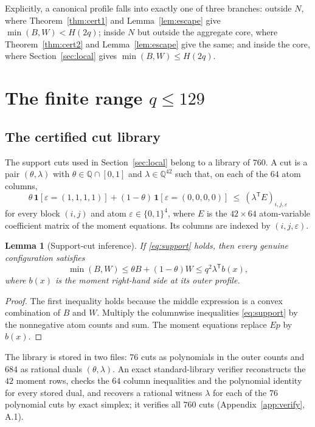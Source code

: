 \documentclass[11pt]{amsart}
\newtheorem{lemma}[theorem]{Lemma}
\theoremstyle{definition}
\theoremstyle{remark}
\newcommand{\Q}{\mathbb{Q}}
\begin{document}
Explicitly, a canonical profile falls into exactly one of three branches: outside $N$, where Theorem~\ref{thm:cert1} and Lemma~\ref{lem:escape} give $\min(B,W)<H(2q)$; inside $N$ but outside the aggregate core, where Theorem~\ref{thm:cert2} and Lemma~\ref{lem:escape} give the same; and inside the core, where Section~\ref{sec:local} gives $\min(B,W)\le H(2q)$.

\section{The finite range \texorpdfstring{$q\le129$}{q <= 129}}\label{sec:ladder}

\subsection{The certified cut library}

The support cuts used in Section~\ref{sec:local} belong to a library of
$760$.  A cut is a pair $(\theta,\lambda)$ with
$\theta\in\Q\cap[0,1]$ and $\lambda\in\Q^{42}$ such that, on each of the
$64$ atom columns,
\begin{equation}\label{eq:support}
\theta\,\mathbf 1[\varepsilon=(1,1,1,1)]
+(1-\theta)\,\mathbf 1[\varepsilon=(0,0,0,0)]
\ \le\ (\lambda^{\mathsf T}E)_{i,j,\varepsilon}
\end{equation}
for every block $(i,j)$ and atom $\varepsilon\in\{0,1\}^4$, where $E$ is
the $42\times64$ atom-variable coefficient matrix of the moment equations.
Its columns are indexed by $(i,j,\varepsilon)$.

\begin{lemma}[Support-cut inference]\label{lem:cutsound}
If \eqref{eq:support} holds, then every genuine configuration satisfies
\[
\min(B,W)\le\theta B+(1-\theta)W
\le q^2\lambda^{\mathsf T}b(x),
\]
where $b(x)$ is the moment right-hand side at its outer profile.
\end{lemma}

\begin{proof}
The first inequality holds because the middle expression is a convex
combination of $B$ and $W$.  Multiply the columnwise inequalities
\eqref{eq:support} by the nonnegative atom counts and sum.  The moment
equations replace $Ep$ by $b(x)$.
\end{proof}

The library is stored in two files: $76$ cuts as polynomials in the outer
counts and $684$ as rational duals $(\theta,\lambda)$.  An exact
standard-library verifier reconstructs the $42$ moment rows, checks the $64$
column inequalities and the polynomial identity for every stored dual, and
recovers a rational witness $\lambda$ for each of the $76$ polynomial cuts
by exact simplex; it verifies all $760$ cuts (Appendix~\ref{app:verify},
A.1).
\end{document}
